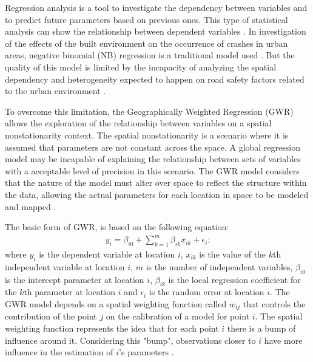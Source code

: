 Regression analysis is a tool to investigate the dependency between variables and to predict future parameters based on previous ones. This type of statistical analysis can show the relationship between dependent variables \cite{Lindley1987}. In investigation of the effects of the built environment on the occurrence of crashes in urban areas, negative binomial (NB) regression is a traditional model used \cite{Wei2013, Zhang2014}. But the quality of this model is limited by the incapacity of analyzing the spatial dependency and heterogeneity expected to happen on road safety factors related to the urban environment \cite{Obelheiro2019}.


To overcome this limitation, the Geographically Weighted Regression (GWR) allows the exploration of the relationship between variables on a spatial nonstationarity context. The spatial nonstationarity is a scenario where it is assumed that parameters are not constant across the space. A global regression model may be incapable of explaining the relationship between sets of variables with a acceptable level of precision in this scenario. The GWR model considers that the nature of the model must alter over space to reflect the structure within the data, allowing the actual parameters for each location in space to be modeled and mapped \cite{Brunsdon2010}.

The basic form of GWR, is based on the following equation:\begin{align}
    y_i = \beta_{i0} + \sum_{k=1}^{m} \beta_{ik} x_{ik} + \epsilon_i \mbox{;}
    \label{eq:gwr}
\end{align} where $y_i$ is the dependent variable at location $i$, $x_{ik}$ is the value of the $k$th independent variable at location $i$, $m$ is the number of independent variables, $\beta_{i0}$ is the intercept parameter at location $i$, $\beta_{ik}$ is the local regression coefficient for the $k$th parameter at location $i$ and $\epsilon_i$ is the random error at location $i$. The GWR model depends on a spatial weighting function called $w_{ij}$ that controls the contribution of the point $j$ on the calibration of a model for point $i$. The spatial weighting function represents the idea that for each point $i$ there is a bump of influence around it. Considering this "bump", observations closer to $i$ have more influence in the estimation of $i$'s parameters \cite{Brunsdon2010,Gollini2013}.

